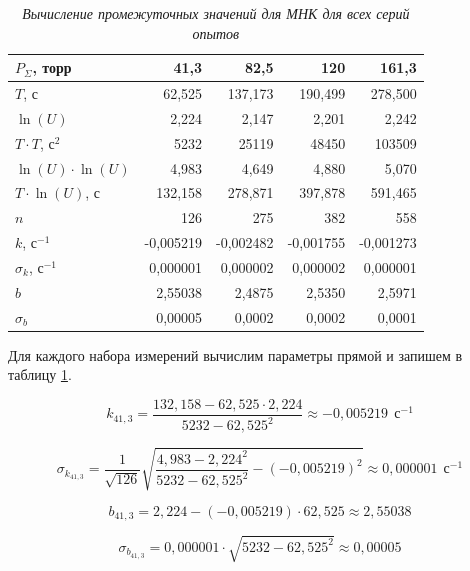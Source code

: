 \documentclass[a4paper,12pt]{article}
\begin{document}
\begin{table}[!h]
    \centering
    \begin{tabular}{|l|r|r|r|r|}
    \hline
        $P_\Sigma$, торр & 41,3 & 82,5 & 120 & 161,3 \\ \hline
        $T$, с & 62,525 & 137,173 & 190,499 & 278,500 \\ \hline
        $\ln(U)$ & 2,224 & 2,147 & 2,201 & 2,242 \\ \hline
        $T \cdot T$, $\text{с}^2$ & 5232 & 25119 & 48450 & 103509 \\ \hline
        $\ln(U) \cdot \ln(U)$ & 4,983 & 4,649 & 4,880 & 5,070 \\ \hline
        $T \cdot \ln(U)$, с & 132,158 & 278,871 & 397,878 & 591,465 \\ \hline
        $n$ & 126 & 275 & 382 & 558 \\ \hline
        $k$, $\text{с}^{-1}$ & -0,005219 & -0,002482 & -0,001755 & -0,001273 \\ \hline
        $\sigma_k$, $\text{с}^{-1}$ & 0,000001 & 0,000002 & 0,000002 & 0,000001 \\ \hline
        $b$ & 2,55038 & 2,4875 & 2,5350 & 2,5971 \\ \hline
        $\sigma_b$ & 0,00005 & 0,0002 & 0,0002 & 0,0001 \\ \hline
    \end{tabular}\caption{\textit{Вычисление промежуточных значений для МНК для всех серий опытов}}\label{table:mnk-1}
\end{table}

Для каждого набора измерений вычислим параметры прямой и запишем в таблицу \ref{table:mnk-1}.

\begin{equation*}
    k_{41,3} = \frac{132,158 - 62,525 \cdot 2,224}{5232 - {62,525}^2} \approx -0,005219 \ \ \text{с}^{-1}
\end{equation*}

\begin{equation*}
    \sigma_{k_{41,3}} = \frac{1}{\sqrt{126}} \sqrt{\frac{4,983 - {2,224}^2}{5232 - {62,525}^2} - ({-0,005219})^2} \approx 0,000001 \ \ \text{с}^{-1}
\end{equation*}

\begin{equation*}
    b_{41,3} = 2,224 - (-0,005219) \cdot 62,525 \approx 2,55038
\end{equation*}

\begin{equation*}
    \sigma_{b_{41,3}} = 0,000001 \cdot \sqrt{5232 - {62,525}^2} \approx 0,00005
\end{equation*}
\end{document}
